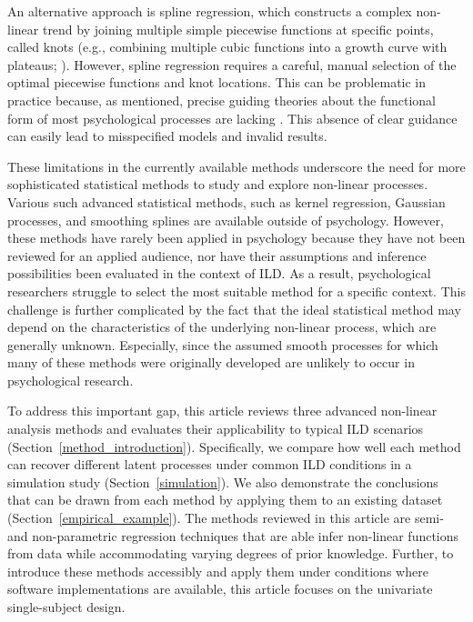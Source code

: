 \documentclass[jou, floatsintext]{apa7}
\begin{document}
An alternative approach is spline regression, which constructs a complex
non-linear trend by joining multiple simple piecewise functions at specific
points, called knots (e.g., combining multiple cubic functions into a growth
curve with plateaus; \textcite{tsay_nonlinear_2019}). However, spline
regression requires a careful, manual selection of the optimal piecewise
functions and knot locations. This can be problematic in practice because, as
mentioned, precise guiding theories about the functional form of most
psychological processes are lacking \parencite{tan_time-varying_2011}. This
absence of clear guidance can easily lead to misspecified models and invalid
results.

These limitations in the currently available methods underscore the need for
more sophisticated statistical methods to study and explore non-linear
processes. Various such advanced statistical methods, such as kernel
regression, Gaussian processes, and smoothing splines are available outside of
psychology. However, these methods have rarely been applied in psychology
because they have not been reviewed for an applied audience, nor have their
assumptions and inference possibilities been evaluated in the context of ILD.\@
As a result, psychological researchers struggle to select the most suitable
method for a specific context. This challenge is further complicated by the
fact that the ideal statistical method may depend on the characteristics of the
underlying non-linear process, which are generally unknown. Especially, since
the assumed smooth processes for which many of these methods were originally
developed are unlikely to occur in psychological research.

To address this important gap, this article reviews three advanced non-linear
analysis methods and evaluates their applicability to typical ILD scenarios
(Section~\ref{method_introduction}). Specifically, we compare how well each
method can recover different latent processes under common ILD conditions in a
simulation study (Section~\ref{simulation}). We also demonstrate the
conclusions that can be drawn from each method by applying them to an existing
dataset (Section~\ref{empirical_example}). The methods reviewed in this article
are semi- and non-parametric regression techniques that are able infer
non-linear functions from data while accommodating varying degrees of prior
knowledge. Further, to introduce these methods accessibly and apply them under
conditions where software implementations are available, this article focuses
on the univariate single-subject design.
\end{document}
